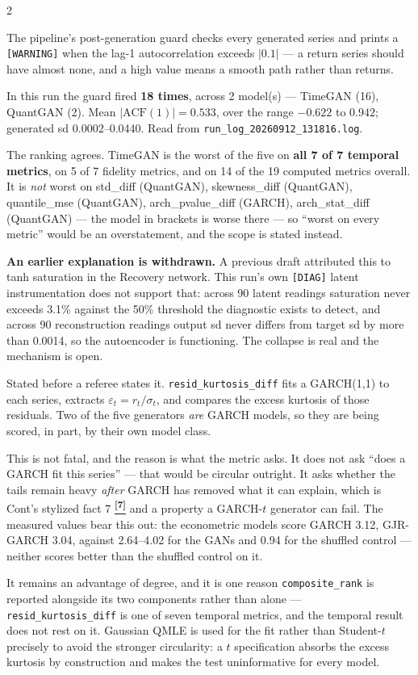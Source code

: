 \documentclass[10pt]{article}
\newcommand{\redbox}[2]{\begin{tcolorbox}[mybox={DRed}{RBg},title={#1}]#2\end{tcolorbox}}
\newcommand{\indigobox}[2]{\begin{tcolorbox}[mybox={Indigo}{IBg},title={#1}]#2\end{tcolorbox}}
\newcommand{\tcite}[1]{%
  \hyperlink{R:#1}{\textsuperscript{\scriptsize\textbf{[#1]}}}}
\begin{document}
\begin{multicols}{2}
\redbox{Mode Collapse, Caught by the Guard}{%
The pipeline's post-generation guard checks every generated series and prints a \texttt{[WARNING]} when the lag-1 autocorrelation exceeds $|0.1|$ --- a return series should have almost none, and a high value means a smooth path rather than returns.

\smallskip
In this run the guard fired \textbf{18 times}, across 2 model(s) --- TimeGAN (16), QuantGAN (2). Mean \(|\text{ACF}(1)| = 0.533\), over the range \(-0.622\) to \(0.942\); generated sd 0.0002--0.0440. Read from \texttt{run\_log\_20260912\_131816.log}.

\smallskip
The ranking agrees. TimeGAN is the worst of the five on \textbf{all 7 of 7 temporal metrics}, on 5 of 7 fidelity metrics, and on 14 of the 19 computed metrics overall. It is \emph{not} worst on std\_diff (QuantGAN), skewness\_diff (QuantGAN), quantile\_mse (QuantGAN), arch\_pvalue\_diff (GARCH), arch\_stat\_diff (QuantGAN) --- the model in brackets is worse there --- so ``worst on every metric'' would be an overstatement, and the scope is stated instead.

\smallskip
\textbf{An earlier explanation is withdrawn.} A previous draft attributed this to tanh saturation in the Recovery network. This run's own \texttt{[DIAG]} latent instrumentation does not support that: across 90 latent readings saturation never exceeds 3.1\% against the 50\% threshold the diagnostic exists to detect, and across 90 reconstruction readings output sd never differs from target sd by more than 0.0014, so the autoencoder is functioning. The collapse is real and the mechanism is open.}

\indigobox{Metric Circularity: \texttt{resid\_kurtosis\_diff}}{%
Stated before a referee states it. \texttt{resid\_kurtosis\_diff} fits a GARCH(1,1) to each series, extracts $\varepsilon_t = r_t/\sigma_t$, and compares the excess kurtosis of those residuals. Two of the five generators \emph{are} GARCH models, so they are being scored, in part, by their own model class.

\smallskip
This is not fatal, and the reason is what the metric asks. It does not ask ``does a GARCH fit this series'' --- that would be circular outright. It asks whether the tails remain heavy \emph{after} GARCH has removed what it can explain, which is Cont's stylized fact 7\tcite{7} and a property a GARCH-$t$ generator can fail. The measured values bear this out: the econometric models score GARCH 3.12, GJR-GARCH 3.04, against 2.64--4.02 for the GANs and 0.94 for the shuffled control --- neither scores better than the shuffled control on it.

\smallskip
It remains an advantage of degree, and it is one reason \texttt{composite\_rank} is reported alongside its two components rather than alone --- \texttt{resid\_kurtosis\_diff} is one of seven temporal metrics, and the temporal result does not rest on it. Gaussian QMLE is used for the fit rather than Student-$t$ precisely to avoid the stronger circularity: a $t$ specification absorbs the excess kurtosis by construction and makes the test uninformative for every model.}

\end{multicols}
\end{document}
